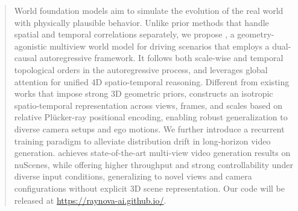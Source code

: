 \begin{abstract}
World foundation models aim to simulate the evolution of the real world with physically plausible behavior. Unlike prior methods that handle spatial and temporal correlations separately, we propose \ourmethod{}, a geometry-agonistic multiview world model for driving scenarios that employs a dual-causal autoregressive framework. It follows both scale-wise and temporal topological orders in the autoregressive process, and leverages global attention for unified 4D spatio-temporal reasoning. Different from existing works that impose strong 3D geometric priors, \ourmethod{} constructs an isotropic spatio-temporal representation across views, frames, and scales based on relative Plücker-ray positional encoding, enabling robust generalization to diverse camera setups and ego motions. We further introduce a recurrent training paradigm to alleviate distribution drift in long-horizon video generation. \ourmethod{} achieves state-of-the-art multi-view video generation results on nuScenes, while offering higher throughput and strong controllability under diverse input conditions, generalizing to novel views and camera configurations without explicit 3D scene representation. Our code will be released at \href{https://raynova-ai.github.io/}{https://raynova-ai.github.io/}.

\end{abstract}